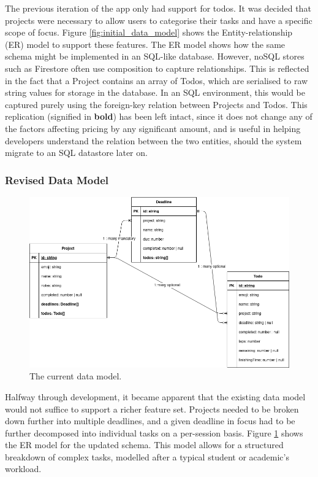 The previous iteration of the app only had support for todos. It was decided that projects were necessary to allow users to categorise their tasks and have a specific scope of focus. Figure \ref{fig:initial_data_model} shows the Entity-relationship (ER) model to support these features. The ER model shows how the same schema might be implemented in an SQL-like database. However, noSQL stores such as Firestore often use composition to capture relationships. This is reflected in the fact that a Project contains an array of Todos, which are serialised to raw string values for storage in the database. In an SQL environment, this would be captured purely using the foreign-key relation between Projects and Todos. This replication (signified in \textbf{bold}) has been left intact, since it does not change any of the factors affecting pricing by any significant amount, and is useful in helping developers understand the relation between the two entities, should the system migrate to an SQL datastore later on.

\subsubsection{Revised Data Model}
\begin{figure}[h]
    \begin{center}
        \includegraphics[scale=0.5]{images/final_data_model.png}
    \end{center}
    \caption{The current data model.}
    \label{fig:app_current_data_model}
\end{figure}

Halfway through development, it became apparent that the existing data model would not suffice to support a richer feature set. Projects needed to be broken down further into multiple deadlines, and a given deadline in focus had to be further decomposed into individual tasks on a per-session basis. Figure \ref{fig:app_current_data_model} shows the ER model for the updated schema. This model allows for a structured breakdown of complex tasks, modelled after a typical student or academic's workload.

